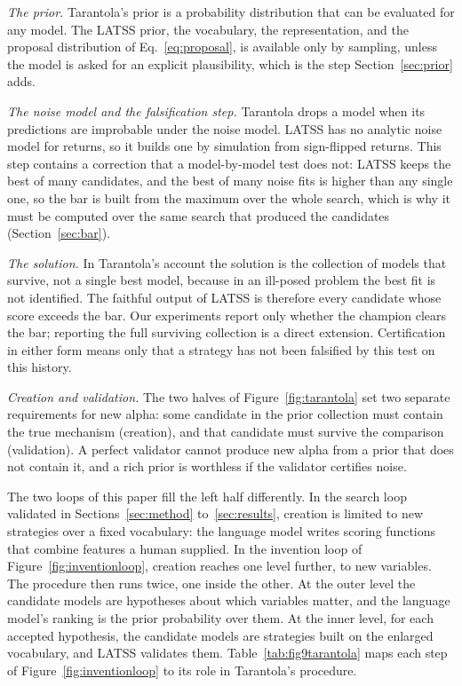 \documentclass[11pt]{article}
\begin{document}
\emph{The prior.} Tarantola's prior is a probability distribution that can be evaluated for any model.
The LATSS prior, the vocabulary, the representation, and the proposal distribution of
Eq.~\eqref{eq:proposal}, is available only by sampling, unless the model is asked for an explicit
plausibility, which is the step Section~\ref{sec:prior} adds.

\emph{The noise model and the falsification step.} Tarantola drops a model when its predictions are
improbable under the noise model. LATSS has no analytic noise model for returns, so it builds one by
simulation from sign-flipped returns. This step contains a correction that a model-by-model test does
not: LATSS keeps the best of many candidates, and the best of many noise fits is higher than any single
one, so the bar is built from the maximum over the whole search, which is why it must be computed over
the same search that produced the candidates (Section~\ref{sec:bar}).

\emph{The solution.} In Tarantola's account the solution is the collection of models that survive, not a
single best model, because in an ill-posed problem the best fit is not identified. The faithful output of
LATSS is therefore every candidate whose score exceeds the bar. Our experiments report only whether the
champion clears the bar; reporting the full surviving collection is a direct extension. Certification in
either form means only that a strategy has not been falsified by this test on this history.

\emph{Creation and validation.} The two halves of Figure~\ref{fig:tarantola} set two separate
requirements for new alpha: some candidate in the prior collection must contain the true mechanism
(creation), and that candidate must survive the comparison (validation). A perfect validator cannot
produce new alpha from a prior that does not contain it, and a rich prior is worthless if the validator
certifies noise.

The two loops of this paper fill the left half differently. In the search loop validated in
Sections~\ref{sec:method} to~\ref{sec:results}, creation is limited to new strategies over a fixed
vocabulary: the language model writes scoring functions that combine features a human supplied. In the
invention loop of Figure~\ref{fig:inventionloop}, creation reaches one level further, to new variables.
The procedure then runs twice, one inside the other. At the outer level the candidate models are
hypotheses about which variables matter, and the language model's ranking is the prior probability over
them. At the inner level, for each accepted hypothesis, the candidate models are strategies built on the
enlarged vocabulary, and LATSS validates them. Table~\ref{tab:fig9tarantola} maps each step of
Figure~\ref{fig:inventionloop} to its role in Tarantola's procedure.
\end{document}
